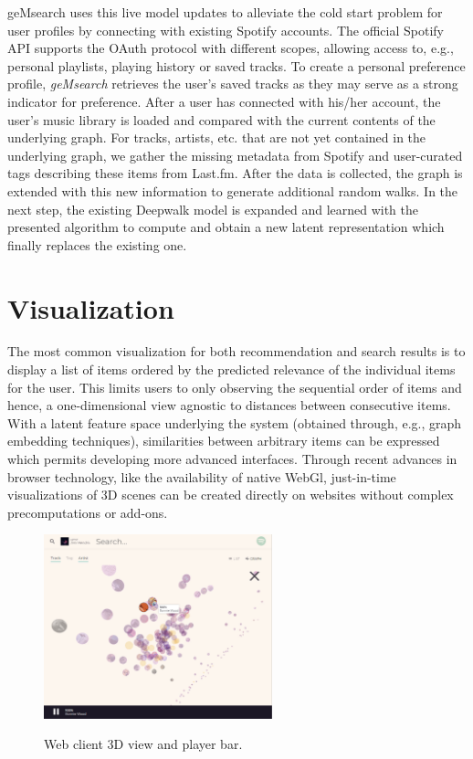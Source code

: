 \documentclass[sigconf]{acmart}
\begin{document}
geMsearch uses this live model updates to alleviate the cold start problem for user profiles by connecting with existing Spotify accounts. The official Spotify API supports the OAuth protocol with different scopes, allowing access to, e.g., personal playlists, playing history or saved tracks. To create a personal preference profile, \emph{geMsearch} retrieves the user's saved tracks as they may serve as a strong indicator for preference. %
After a user has connected with his/her account, the user's music library is loaded and compared with the current contents of the underlying graph. For tracks, artists, etc. that are not yet contained in the underlying graph, we gather the missing metadata from Spotify and user-curated tags describing these items from Last.fm. After the data is collected, the graph is extended with this new information to generate additional random walks. In the next step, the existing Deepwalk model is expanded and learned with the presented algorithm to compute and obtain a new latent representation which finally replaces the existing one.

\section{Visualization}
\label{sec:viz_approach}

The most common visualization for both recommendation and search results is to display a list of items ordered by the predicted relevance of the individual items for the user. This limits users to only observing the sequential order of items and hence, a one-dimensional view agnostic to distances between consecutive items. With a latent feature space underlying the system (obtained through, e.g., graph embedding techniques), similarities between arbitrary items can be expressed which permits developing more advanced interfaces. Through recent advances in browser technology, like the availability of native WebGl, just-in-time visualizations of 3D scenes can be created directly on websites without complex precomputations or add-ons. 


\begin{figure}[ht]
	{\includegraphics[width=250px]{images/webclient_3d.jpg}}	
	\caption{Web client 3D view and player bar.}
	\label{fig:web_client_3d}
\end{figure}
\end{document}
